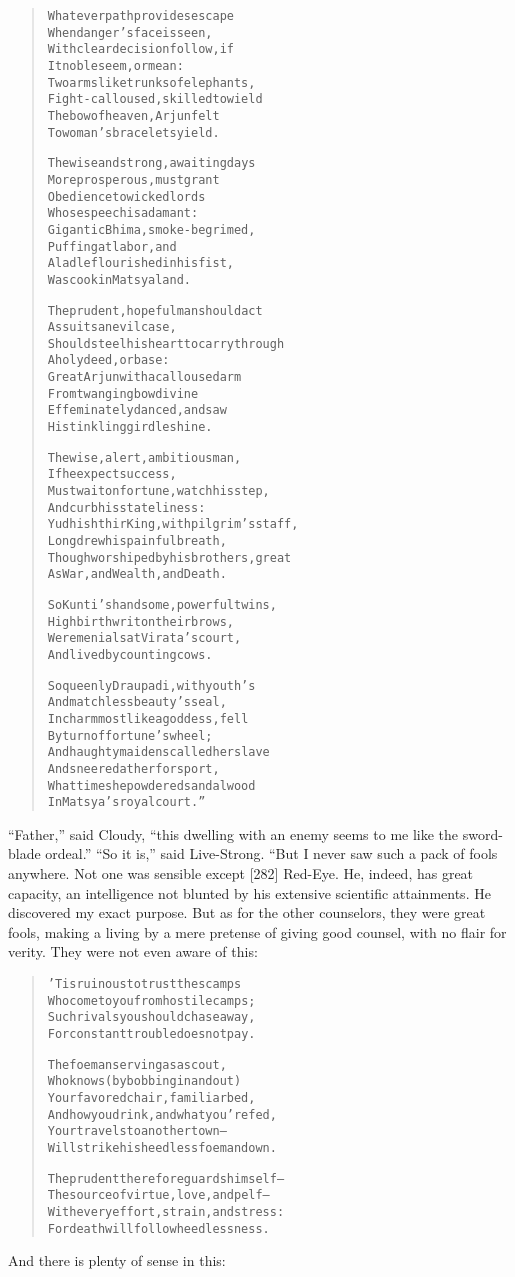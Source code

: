\documentclass[article, twoside, 14pt]{memoir}
\renewenvironment{verbatim}{%
\begin{quote}%
\vskip -10pt%
\begin{alltt}\normalfont\large}{\end{alltt}%
\end{quote}%
\vskip -10pt
} %
\begin{document}
\begin{verbatim}
Whatever path provides escape
    When danger's face is seen,
With clear decision follow, if
    It noble seem, or mean:
Two arms like trunks of elephants,
    Fight-calloused, skilled to wield
The bow of heaven, Arjun felt
    To woman's bracelets yield.

The wise and strong, awaiting days
    More prosperous, must grant
Obedience to wicked lords
    Whose speech is adamant:
Gigantic Bhima, smoke-begrimed,
    Puffing at labor, and
A ladle flourished in his fist,
    Was cook in Matsya land.

The prudent, hopeful man should act
    As suits an evil case,
Should steel his heart to carry through
    A holy deed, or base:
Great Arjun with a calloused arm
    From twanging bow divine
Effeminately danced, and saw
    His tinkling girdle shine.

The wise, alert, ambitious man,
    If he expect success,
Must wait on fortune, watch his step,
    And curb his stateliness:
Yudhishthir King, with pilgrim's staff,
    Long drew his painful breath,
Though worshiped by his brothers, great
    As War, and Wealth, and Death.

So Kunti's handsome, powerful twins,
    High birth writ on their brows,
Were menials at Virata's court,
    And lived by counting cows.

So queenly Draupadi, with youth's
    And matchless beauty's seal,
In charm most like a goddess, fell
    By turn of fortune's wheel;
And haughty maidens called her slave
    And sneered at her for sport,
What time she powdered sandalwood
    In Matsya's royal court.”
\end{verbatim}
``Father,'' said Cloudy,
``this dwelling with an enemy seems to me like the sword-blade ordeal.''
``So it is,'' said Live-Strong. “But I never saw such a pack of
fools anywhere. Not one was sensible except [282] Red-Eye. He,
indeed, has great capacity, an intelligence not blunted by his
extensive scientific attainments. He discovered my exact purpose.
But as for the other counselors, they were great fools, making a
living by a mere pretense of giving good counsel, with no flair for
verity. They were not even aware of this:

\begin{verbatim}
'Tis ruinous to trust the scamps
Who come to you from hostile camps;
Such rivals you should chase away,
For constant trouble does not pay.

The foeman serving as a scout,
Who knows (by bobbing in and out)
Your favored chair, familiar bed,
And how you drink, and what you're fed,
Your travels to another town--
Will strike his heedless foeman down.

The prudent therefore guards himself--
The source of virtue, love, and pelf--
With every effort, strain, and stress:
For death will follow heedlessness.
\end{verbatim}
And there is plenty of sense in this:
\end{document}
